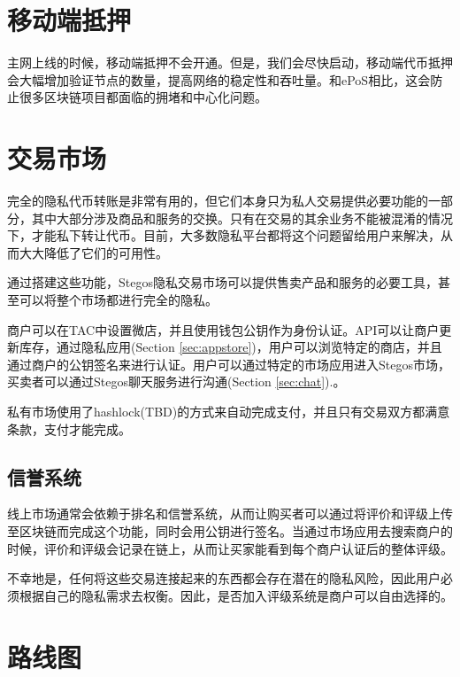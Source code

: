 \documentclass[8pt,fleqn,openany]{book}
\begin{document}
\begin{CJK*}{UTF8}{gbsn}
\section{移动端抵押}\label{sec:mobile-staking}
主网上线的时候，移动端抵押不会开通。但是，我们会尽快启动，移动端代币抵押会大幅增加验证节点的数量，提高网络的稳定性和吞吐量。和ePoS相比，这会防止很多区块链项目都面临的拥堵和中心化问题。

\section{交易市场}\label{sec:marketplaces}
完全的隐私代币转账是非常有用的，但它们本身只为私人交易提供必要功能的一部分，其中大部分涉及商品和服务的交换。只有在交易的其余业务不能被混淆的情况下，才能私下转让代币。目前，大多数隐私平台都将这个问题留给用户来解决，从而大大降低了它们的可用性。

通过搭建这些功能，Stegos隐私交易市场可以提供售卖产品和服务的必要工具，甚至可以将整个市场都进行完全的隐私。

商户可以在TAC中设置微店，并且使用钱包公钥作为身份认证。API可以让商户更新库存，通过隐私应用(Section \ref{sec:appstore})，用户可以浏览特定的商店，并且通过商户的公钥签名来进行认证。用户可以通过特定的市场应用进入Stegos市场，买卖者可以通过Stegos聊天服务进行沟通(Section \ref{sec:chat}).。

私有市场使用了hashlock(TBD)的方式来自动完成支付，并且只有交易双方都满意条款，支付才能完成。

\subsection{信誉系统}
线上市场通常会依赖于排名和信誉系统，从而让购买者可以通过将评价和评级上传至区块链而完成这个功能，同时会用公钥进行签名。当通过市场应用去搜索商户的时候，评价和评级会记录在链上，从而让买家能看到每个商户认证后的整体评级。

不幸地是，任何将这些交易连接起来的东西都会存在潜在的隐私风险，因此用户必须根据自己的隐私需求去权衡。因此，是否加入评级系统是商户可以自由选择的。

\section{路线图}\label{sec:roadmap}


\end{CJK*}
\end{document}
